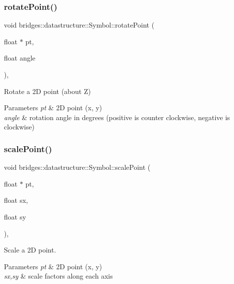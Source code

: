 \subsubsection{\texorpdfstring{rotate\+Point()}{rotatePoint()}}
{\footnotesize\ttfamily void bridges\+::datastructure\+::\+Symbol\+::rotate\+Point (\begin{DoxyParamCaption}\item[{float $\ast$}]{pt,  }\item[{float}]{angle }\end{DoxyParamCaption})\hspace{0.3cm}{\ttfamily [inline]}, {\ttfamily [protected]}}



Rotate a 2D point (about Z) 


\begin{DoxyParams}{Parameters}
{\em pt} & 2D point (x, y) \\
\hline
{\em angle} & rotation angle in degrees (positive is counter clockwise, negative is clockwise) \\
\hline
\end{DoxyParams}
\mbox{\label{classbridges_1_1datastructure_1_1_symbol_ac27131f6461a763e55f1127f3cf87932}} 
\subsubsection{\texorpdfstring{scale\+Point()}{scalePoint()}}
{\footnotesize\ttfamily void bridges\+::datastructure\+::\+Symbol\+::scale\+Point (\begin{DoxyParamCaption}\item[{float $\ast$}]{pt,  }\item[{float}]{sx,  }\item[{float}]{sy }\end{DoxyParamCaption})\hspace{0.3cm}{\ttfamily [inline]}, {\ttfamily [protected]}}



Scale a 2D point. 


\begin{DoxyParams}{Parameters}
{\em pt} & 2D point (x, y) \\
\hline
{\em sx,sy} & scale factors along each axis \\
\hline
\end{DoxyParams}
\mbox{\label{classbridges_1_1datastructure_1_1_symbol_a98a1c3d133e7fe2150d933495e421760}} 
